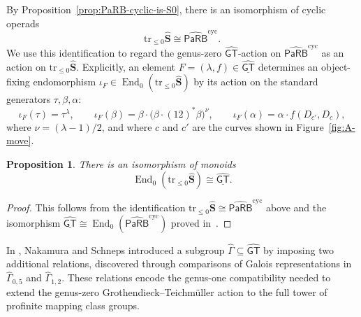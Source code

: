 \documentclass{amsart}
\newcommand{\bS}{\mathbf{S}}
\newcommand{\PaRB}{\mathsf{PaRB}}
\newcommand{\End}{\operatorname{End}}
\newcommand{\trun}[1]{\mathrm{tr}_{\leq{#1}}}
\newcommand{\GT}{\widehat{\mathsf{GT}}}
\newcommand{\NS}{\widehat{\mathsf{\Gamma}}}
\newtheorem{prop}[theorem]{Proposition}%
\newtheorem{cor}[theorem]{Corollary}%
\theoremstyle{definition}
\numberwithin{equation}{section}
\begin{document}
By Proposition~\ref{prop:PaRB-cyclic-is-S0}, there is an isomorphism of cyclic operads
\[
\trun{0}\widehat{\bS}\cong \widehat{\PaRB}^{\mathrm{cyc}}.
\]
We use this identification to regard the genus-zero $\GT$-action on $\widehat{\PaRB}^{\mathrm{cyc}}$ as an action on $\trun{0}\widehat{\bS}$. Explicitly, an element $F=(\lambda,f)\in\underline{\GT}$ determines an object-fixing endomorphism $\iota_F\in\End_0(\trun{0}\widehat{\bS})$ by its action on the standard generators $\tau,\beta,\alpha$:
\[
\iota_F(\tau)=\tau^\lambda,\qquad
\iota_F(\beta)=\beta\cdot\bigl(\beta\cdot(12)^*\beta\bigr)^\nu,\qquad
\iota_F(\alpha)=\alpha\cdot f(D_{c'},D_c),
\]
where $\nu=(\lambda-1)/2$, and where $c$ and $c'$ are the curves shown in Figure~\ref{fig:A-move}.

\begin{prop}\label{prop:genus-zero-GT}
There is an isomorphism of monoids
\[
\End_0(\trun{0}\widehat{\bS})
\cong
\underline{\GT}.
\]
\end{prop}

\begin{proof}
This follows from the identification $\trun{0}\widehat{\bS}\cong \widehat{\PaRB}^{\mathrm{cyc}}$ above and the isomorphism $\underline{\GT}\cong \End_0(\widehat{\PaRB}^{\mathrm{cyc}})$ proved in~\cite[Theorem~5.4]{robertson2025grothendieck}.
\end{proof}

In \cite{Nakamura-Schneps}, Nakamura and Schneps introduced a subgroup $\NS\subseteq \GT$ by imposing two additional relations, discovered through comparisons of Galois representations in $\widehat{\Gamma}_{0,5}$ and $\widehat{\Gamma}_{1,2}$. These relations encode the genus-one compatibility needed to extend the genus-zero Grothendieck--Teichmüller action to the full tower of profinite mapping class groups.
\end{document}
